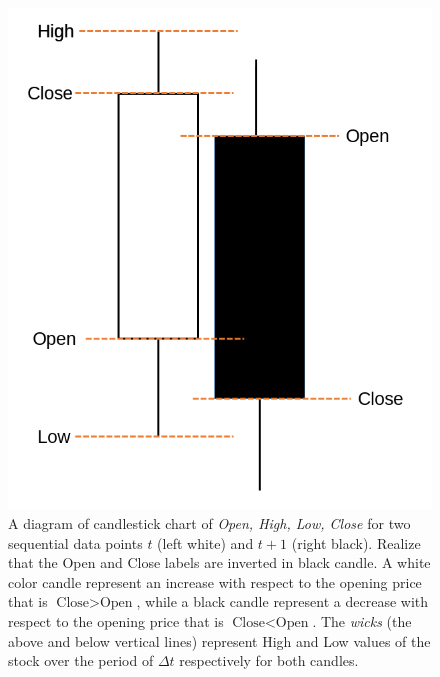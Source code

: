 \documentclass[twocolumn,aps,pra,superscriptaddress,nofootinbib,longbibliography]{revtex4-2}
\begin{document}
\begin{figure}\label{fig:OHLCVfig}
    \centering
    \includegraphics[scale=0.4]{Figs/Figures/OHLCV-Single.png}
    \caption{A diagram of candlestick chart of \textit{Open, High, Low, Close} for two sequential data points \(t\) (left white) and \(t+1\) (right black). Realize that the Open and Close labels are inverted in black candle. A white color candle represent an increase with respect to the opening price that is  \(\text{Close} > \text{Open} \), while a black candle represent a decrease with respect to the opening price that is \(\text{Close} < \text{Open} \). The \textit{wicks} (the above and below vertical lines) represent High and Low values of the stock over the period of \(\Delta t\) respectively for both candles.} 
\end{figure}
\end{document}
